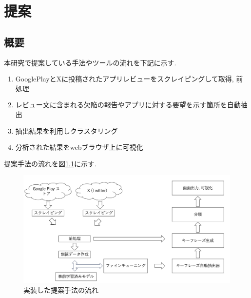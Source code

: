 \chapter{提案}
\label{chap:teian}


\section{概要}
本研究で提案している手法やツールの流れを下記に示す. 

\begin{enumerate}
  \item GooglePlayとXに投稿されたアプリレビューをスクレイピングして取得, 前処理
  \item レビュー文に含まれる欠陥の報告やアプリに対する要望を示す箇所を自動抽出
  \item 抽出結果を利用しクラスタリング
  \item 分析された結果をwebブラウザ上に可視化
\end{enumerate}

提案手法の流れを図\ref{fig:nagare}に示す. 

\begin{figure}[hbtp]
  \centering
  \includegraphics[width=\linewidth]
       {contents/images/zisso_nagare.png}
  \caption{実装した提案手法の流れ\label{fig:nagare}}
\end{figure}


